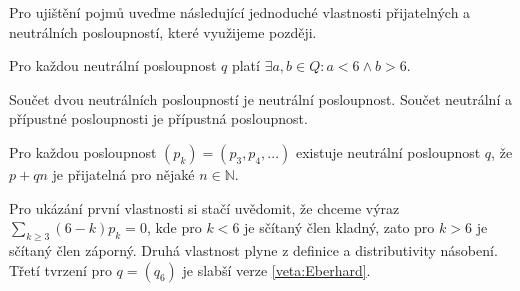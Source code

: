 Pro ujištění pojmů uveďme následující jednoduché vlastnosti přijatelných a neutrálních posloupností, které využijeme později.

\begin{tvrz}\label{veta:posloupnosti}
Pro každou neutrální posloupnost $q$ platí $\exists a,b \in Q : a <6 \wedge b>6$.

Součet dvou neutrálních posloupností je neutrální posloupnost. Součet neutrální a přípustné posloupnosti je přípustná posloupnost.

Pro každou posloupnost $(p_k) = (p_3,p_4,...)$ existuje neutrální posloupnost $q$, že $p+qn$ je přijatelná pro nějaké $n \in \mathbb{N}$.
\end{tvrz}

Pro ukázání první vlastnosti si stačí uvědomit, že chceme výraz $\sum_{k \geq 3}{(6-k)p_k} = 0$, kde pro $k < 6$ je sčítaný člen kladný, zato pro $k>6$ je sčítaný člen záporný. Druhá vlastnost plyne z definice a distributivity násobení. Třetí tvrzení pro $q = (q_6)$ je slabší verze \eqref{veta:Eberhard}.



